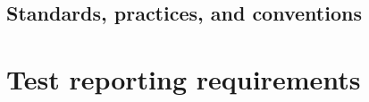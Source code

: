 \subsection{Standards, practices, and conventions} \label{s:details-of-the-master-test-plan:standards-practices-and-conventions}
	\begin{comment}
		$<$ Identify the standards, practices, and conventions that govern the performance of testing tasks including, but not limited to, internal organizational standards, practices, and policies. $>$
	\end{comment}

\section{Test reporting requirements} \label{s:details-of-the-master-test-plan:test-reporting-requirements}
	\begin{comment}
		$<$ Specify the purpose, content, format, recipients, and timing of all test reports. Test reporting consists of Test Logs (Clause 13), Anomaly Reports (Clause 14), Level Interim Test Status Report(s) (Clause 15), Level Test Report(s) (Clause 16), and the Master Test Report (Clause 17). Test reporting may also include optional reports defined by the user of this standard. The format and grouping of the optional reports are user defined and will vary according to subject matter. $>$
	\end{comment}
